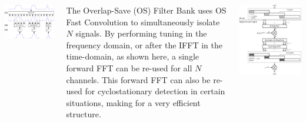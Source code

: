 \documentclass[24pt, a0papper, portrait]{tikzposter}
\begin{document}
\begin{columns}
{        \begin{tikzfigure}
            \includegraphics[width=0.75\linewidth]{polyphase}
            \label{fig:polyphase}
        \end{tikzfigure}
    }
    {
        The Overlap-Save (OS) Filter Bank uses OS Fast Convolution to
        simultaneously isolate $N$ signals. By performing tuning in the
        frequency domain, or after the IFFT in the time-domain, as shown here,
        a single forward FFT can be re-used for all $N$ channels. This forward
        FFT can also be re-used for cyclostationary detection in certain
        situations, making for a very efficient structure.
        \begin{tikzfigure}
            \includegraphics[width=0.85\linewidth]{overlap_save_time_domain}

\end{tikzfigure}}
\end{columns}
\end{document}
